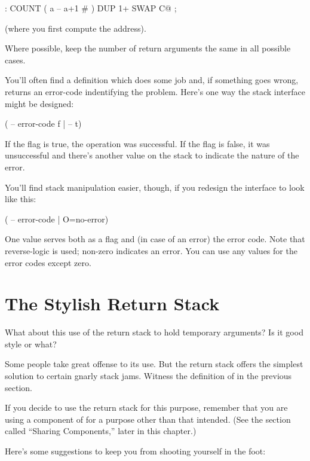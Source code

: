 \begin{Code}
: COUNT  ( a -- a+1 # )  DUP 1+  SWAP C@ ;
\end{Code}
(where you first compute the address).

\begin{tip}
Where possible, keep the number of return arguments the same in all
possible cases.
\end{tip}%
You'll often find a definition which does some job and, if something goes
wrong, returns an error-code indentifying the problem. Here's one way
the stack interface might be designed:

\begin{Code}
( -- error-code f | -- t)
\end{Code}
If the flag is true, the operation was successful. If the flag is false, it was
unsuccessful and there's another value on the stack to indicate the nature
of the error.

You'll find stack manipulation easier, though, if you redesign the interface
to look like this:

\begin{Code}
( -- error-code | O=no-error)
\end{Code}
One value serves both as a flag and (in case of an error) the error code.
Note that reverse-logic is used; non-zero indicates an error. You can use
any values for the error codes except zero.

\section{The Stylish Return Stack}

What about this use of the return stack to hold temporary arguments? Is
it good style or what?

Some people take great offense to its use. But the return stack
offers the simplest solution to certain gnarly stack jams. Witness the
definition of  in the previous section.

If you decide to use the return stack for this purpose, remember
that you are using a component of \Forth{} for a purpose other than that
intended. (See the section called ``Sharing Components,'' later in this
chapter.)

Here's some suggestions to keep you from shooting yourself in the
foot:

